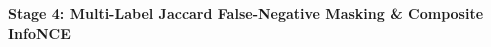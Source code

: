 \documentclass[preview]{standalone}
\begin{document}
\begin{center}
\textbf{Stage 4: Multi-Label Jaccard False-Negative Masking \& Composite InfoNCE}
\end{center}
\end{document}
